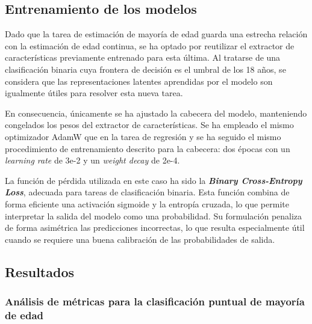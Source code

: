 
\subsection{Entrenamiento de los modelos}

Dado que la tarea de estimación de mayoría de edad guarda una estrecha relación con la estimación de edad continua, se ha optado por reutilizar el extractor de características previamente entrenado para esta última. Al tratarse de una clasificación binaria cuya frontera de decisión es el umbral de los 18 años, se considera que las representaciones latentes aprendidas por el modelo son igualmente útiles para resolver esta nueva tarea.

En consecuencia, únicamente se ha ajustado la cabecera del modelo, manteniendo congelados los pesos del extractor de características. Se ha empleado el mismo optimizador AdamW que en la tarea de regresión y se ha seguido el mismo procedimiento de entrenamiento descrito para la cabecera: dos épocas con un \textit{learning rate} de 3e-2 y un \textit{weight decay} de 2e-4.

La función de pérdida utilizada en este caso ha sido la \textbf{\textit{Binary Cross-Entropy Loss}}, adecuada para tareas de clasificación binaria. Esta función combina de forma eficiente una activación sigmoide y la entropía cruzada, lo que permite interpretar la salida del modelo como una probabilidad. Su formulación penaliza de forma asimétrica las predicciones incorrectas, lo que resulta especialmente útil cuando se requiere una buena calibración de las probabilidades de salida.

\subsection{Resultados}

\subsubsection{Análisis de métricas para la clasificación puntual de mayoría de edad}

